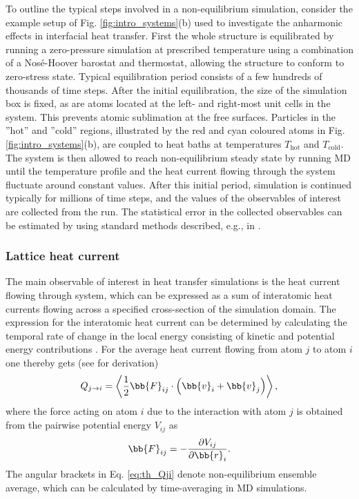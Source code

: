 To outline the typical steps involved in a non-equilibrium simulation, consider the example setup of Fig. \ref{fig:intro_systems}(b) used to investigate the anharmonic effects in interfacial heat transfer. First the whole structure is equilibrated by running a zero-pressure simulation at prescribed temperature using a combination of a Nos\'e-Hoover barostat and thermostat, allowing the structure to conform to zero-stress state. Typical equilibration period consists of a few hundreds of thousands of time steps. After the initial equilibration, the size of the simulation box is fixed, as are atoms located at the left- and right-most unit cells in the system. This prevents atomic sublimation at the free surfaces. Particles in the ''hot'' and ''cold'' regions, illustrated by the red and cyan coloured atoms in Fig. \ref{fig:intro_systems}(b), are coupled to heat baths at temperatures $T_{\textrm{hot}}$ and $T_{\textrm{cold}}$. The system is then allowed to reach non-equilibrium steady state by running MD until the temperature profile and the heat current flowing through the system fluctuate around constant values. After this initial period, simulation is continued typically for millions of time steps, and the values of the observables of interest are collected from the run. The statistical error in the collected observables can be estimated by using standard methods described, e.g., in .



\subsubsection{Lattice heat current}
\label{sec:spectral}
The main observable of interest in heat transfer simulations is the heat current flowing through system, which can be expressed as a sum of interatomic heat currents flowing across a specified cross-section of the simulation domain. The expression for the interatomic heat current can be determined by calculating the temporal rate of change in the local energy consisting of kinetic and potential energy contributions \cite{hardy63,lepri03}. For the average heat current flowing from atom $j$ to atom $i$ one thereby gets (see  for derivation) 
\begin{equation}
 Q_{j\to i} = \left\langle \frac{1}{2} \bb{F}_{ij} \cdot \left( \bb{v}_i+\bb{v}_j \right) \right\rangle, \label{eq:th_Qji}
\end{equation}
where the force acting on atom $i$ due to the interaction with atom $j$ is obtained from the pairwise potential energy $V_{ij}$ as
\begin{equation}
 \bb{F}_{ij} = - \frac{\partial V_{ij}}{\partial \bb{r}_i}.
\end{equation}
The angular brackets in Eq. \eqref{eq:th_Qji} denote non-equilibrium ensemble average, which can be calculated by time-averaging in MD simulations. 

